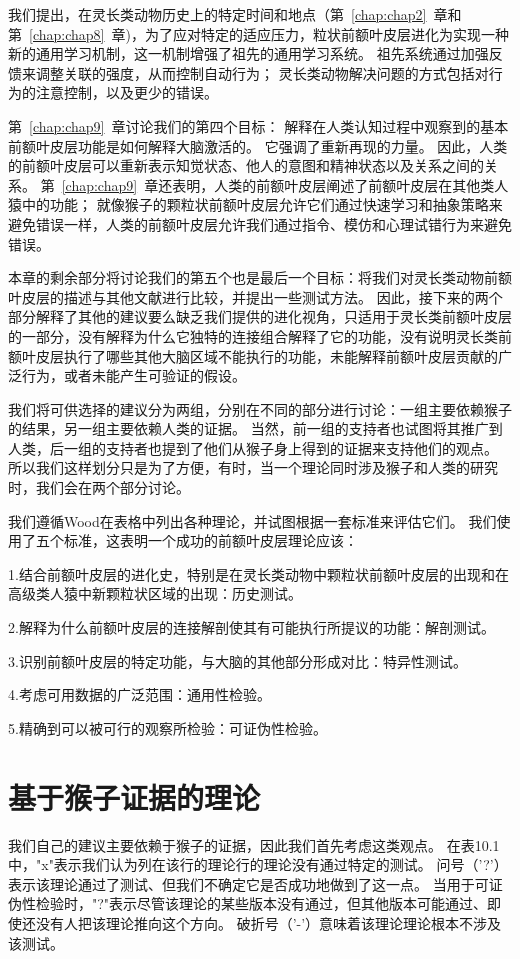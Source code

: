 我们提出，在灵长类动物历史上的特定时间和地点（第~\ref{chap:chap2}~章和第~\ref{chap:chap8}~章)，为了应对特定的适应压力，粒状前额叶皮层进化为实现一种新的通用学习机制，这一机制增强了祖先的通用学习系统。
祖先系统通过加强反馈来调整关联的强度，从而控制自动行为；
灵长类动物解决问题的方式包括对行为的注意控制，以及更少的错误。
\par 
第~\ref{chap:chap9}~章讨论我们的第四个目标：
解释在人类认知过程中观察到的基本前额叶皮层功能是如何解释大脑激活的。
它强调了重新再现的力量。
因此，人类的前额叶皮层可以重新表示知觉状态、他人的意图和精神状态以及关系之间的关系。
第~\ref{chap:chap9}~章还表明，人类的前额叶皮层阐述了前额叶皮层在其他类人猿中的功能；
就像猴子的颗粒状前额叶皮层允许它们通过快速学习和抽象策略来避免错误一样，人类的前额叶皮层允许我们通过指令、模仿和心理试错行为来避免错误。
\par 
本章的剩余部分将讨论我们的第五个也是最后一个目标：将我们对灵长类动物前额叶皮层的描述与其他文献进行比较，并提出一些测试方法。
因此，接下来的两个部分解释了其他的建议要么缺乏我们提供的进化视角，只适用于灵长类前额叶皮层的一部分，没有解释为什么它独特的连接组合解释了它的功能，没有说明灵长类前额叶皮层执行了哪些其他大脑区域不能执行的功能，未能解释前额叶皮层贡献的广泛行为，或者未能产生可验证的假设。
\par 
我们将可供选择的建议分为两组，分别在不同的部分进行讨论：一组主要依赖猴子的结果，另一组主要依赖人类的证据。
当然，前一组的支持者也试图将其推广到人类，后一组的支持者也提到了他们从猴子身上得到的证据来支持他们的观点。
所以我们这样划分只是为了方便，有时，当一个理论同时涉及猴子和人类的研究时，我们会在两个部分讨论。
\par 
我们遵循Wood在表格中列出各种理论，并试图根据一套标准来评估它们\cite{wood2003human}。
我们使用了五个标准，这表明一个成功的前额叶皮层理论应该：
\par 
1.结合前额叶皮层的进化史，特别是在灵长类动物中颗粒状前额叶皮层的出现和在高级类人猿中新颗粒状区域的出现：历史测试。
\par 
2.解释为什么前额叶皮层的连接解剖使其有可能执行所提议的功能：解剖测试。
\par 
3.识别前额叶皮层的特定功能，与大脑的其他部分形成对比：特异性测试。
\par 
4.考虑可用数据的广泛范围：通用性检验。
\par 
5.精确到可以被可行的观察所检验：可证伪性检验。


\section{基于猴子证据的理论}
我们自己的建议主要依赖于猴子的证据，因此我们首先考虑这类观点。
在表10.1中，"x"表示我们认为列在该行的理论行的理论没有通过特定的测试。
问号（'?'）表示该理论通过了测试、但我们不确定它是否成功地做到了这一点。
当用于可证伪性检验时，"?"表示尽管该理论的某些版本没有通过，但其他版本可能通过、即使还没有人把该理论推向这个方向。
破折号（'-'）意味着该理论理论根本不涉及该测试。
\par


